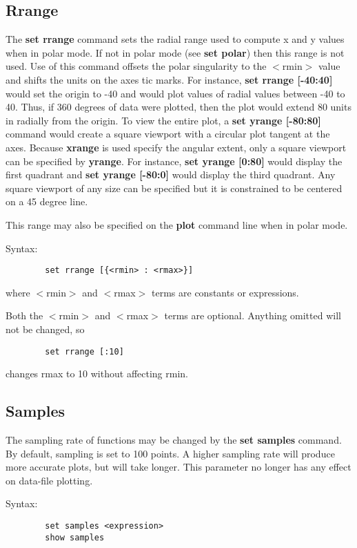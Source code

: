 \subsection{Rrange}
The {\bf set rrange} command sets the radial range used to compute x and y
values when in polar mode. If not in polar mode (see {\bf set polar}) then
this range is not used. Use of this command offsets the polar
singularity to the $<$rmin$>$ value and shifts the units on the axes tic
marks. For instance, {\bf set rrange [-40:40]} would set the origin to -40
and would plot values of radial values between -40 to 40. Thus, if
360 degrees of data were plotted, then the plot would extend 80 units
in radially from the origin.  To view the entire plot,  a 
{\bf set yrange [-80:80]} command would create a square viewport with
a circular plot tangent at the axes.  Because {\bf xrange} is used
specify the angular extent, only a square viewport can be specified
by {\bf yrange}.  For instance, {\bf set yrange [0:80]} would display the
first quadrant and {\bf set yrange [-80:0]} would display the third
quadrant.  Any square viewport of any size can be specified but it
is constrained to be centered on a 45 degree line.

This range may also be specified on the {\bf plot} command line when in
polar mode.

Syntax:
\begin{verbatim}
        set rrange [{<rmin> : <rmax>}]
\end{verbatim}

where $<$rmin$>$ and $<$rmax$>$ terms are constants or expressions.

Both the $<$rmin$>$ and $<$rmax$>$ terms are optional. Anything omitted will
not be changed, so 
\begin{verbatim}
        set rrange [:10]
\end{verbatim}
changes rmax to 10 without affecting rmin.
\subsection{Samples}
The sampling rate of functions may be changed by the {\bf set samples}
command. By default, sampling is set to 100 points. A higher sampling
rate will produce more accurate plots, but will take longer. This
parameter no longer has any effect on data-file plotting.

Syntax:
\begin{verbatim}
        set samples <expression>
        show samples
\end{verbatim}
